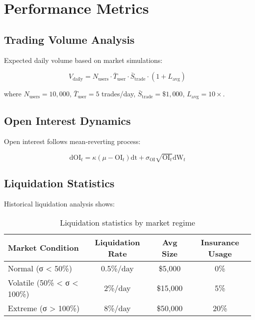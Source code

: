 \documentclass[11pt,a4paper]{article}
\begin{document}
\section{Performance Metrics}

\subsection{Trading Volume Analysis}

Expected daily volume based on market simulations:

\begin{equation}
V_{\text{daily}} = N_{\text{users}} \cdot \bar{T}_{\text{user}} \cdot \bar{S}_{\text{trade}} \cdot (1 + L_{\text{avg}})
\end{equation}

where $N_{\text{users}} = 10,000$, $\bar{T}_{\text{user}} = 5$ trades/day, $\bar{S}_{\text{trade}} = \$1,000$, $L_{\text{avg}} = 10×$.

\subsection{Open Interest Dynamics}

Open interest follows mean-reverting process:

\begin{equation}
\text{dOI}_t = \kappa(\mu - \text{OI}_t)\text{dt} + \sigma_{\text{OI}}\sqrt{\text{OI}_t}\text{dW}_t
\end{equation}

\subsection{Liquidation Statistics}

Historical liquidation analysis shows:

\begin{table}[h]
\centering
\begin{tabular}{|l|c|c|c|}
\hline
\textbf{Market Condition} & \textbf{Liquidation Rate} & \textbf{Avg Size} & \textbf{Insurance Usage} \\
\hline
Normal (σ < 50\%) & 0.5\%/day & \$5,000 & 0\% \\
Volatile (50\% < σ < 100\%) & 2\%/day & \$15,000 & 5\% \\
Extreme (σ > 100\%) & 8\%/day & \$50,000 & 20\% \\
\hline
\end{tabular}
\caption{Liquidation statistics by market regime}
\end{table}
\end{document}
